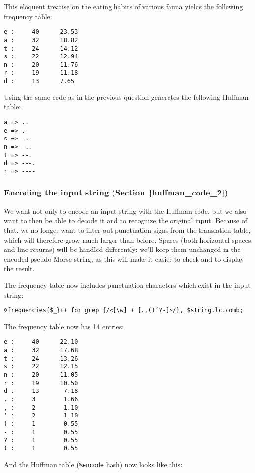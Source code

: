 This eloquent treatise on the eating habits of various fauna 
yields the following frequency table:

\begin{verbatim}
e :     40      23.53
a :     32      18.82
t :     24      14.12
s :     22      12.94
n :     20      11.76
r :     19      11.18
d :     13      7.65
\end{verbatim}

Using the same code as in the previous question generates the 
following Huffman table:

\begin{verbatim}
a => ..
e => .-
s => -.-
n => -..
t => --.
d => ---.
r => ----
\end{verbatim}

\subsubsection{Encoding the input string (Section~\ref{huffman_code_2})}

We want not only to encode an input string with the Huffman code, but 
we also want to then be able to decode it and to recognize the original 
input. Because of that, we no longer want to filter out punctuation signs 
from the translation table, which will therefore grow much larger than 
before. Spaces (both horizontal spaces and line returns) will be handled 
differently: we'll keep them unchanged in the encoded pseudo-Morse 
string, as this will make it easier to check and to display the result.

The frequency table now includes punctuation characters which exist 
in the input string:

\begin{verbatim}
%frequencies{$_}++ for grep {/<[\w] + [.,()’?-]>/}, $string.lc.comb;
\end{verbatim}

The frequency table now has 14 entries:

\begin{verbatim}
e :     40      22.10
a :     32      17.68
t :     24      13.26
s :     22      12.15
n :     20      11.05
r :     19      10.50
d :     13       7.18
. :     3        1.66
, :     2        1.10
’ :     2        1.10
) :     1        0.55
- :     1        0.55
? :     1        0.55
( :     1        0.55
\end{verbatim}

And the Huffman table (\verb'%encode' hash) now looks like this:

